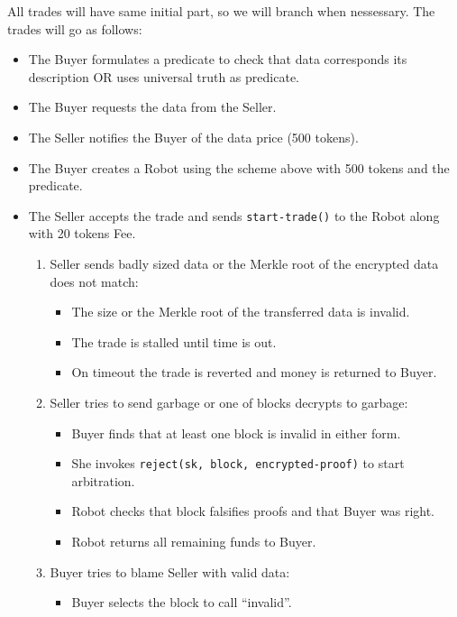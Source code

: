 All trades will have same initial part, so we will branch when nessessary.
The trades will go as follows:
\begin{itemize}
  \item The Buyer formulates a predicate to check that data corresponds its description OR uses universal truth as predicate.
  \item The Buyer requests the data from the Seller.
  \item The Seller notifies the Buyer of the data price (500 tokens).
  \item The Buyer creates a Robot using the scheme above with 500 tokens and the predicate.
  \item The Seller accepts the trade and sends \verb|start-trade()| to the Robot along with 20 tokens Fee.

  \begin{enumerate}
    \item Seller sends badly sized data or the Merkle root of the encrypted data does not match:
      \begin{itemize}
        \item The size or the Merkle root of the transferred data is invalid.
        \item The trade is stalled until time is out.
        \item On timeout the trade is reverted and money is returned to Buyer.
      \end{itemize}
    \item Seller tries to send garbage or one of blocks decrypts to garbage:
      \begin{itemize}
        \item Buyer finds that at least one block is invalid in either form.

        \item She invokes \verb|reject(sk, block, encrypted-proof)| to start arbitration.

        \item Robot checks that block falsifies proofs and that Buyer was right.

        \item Robot returns all remaining funds to Buyer.
      \end{itemize}
    \item Buyer tries to blame Seller with valid data:
      \begin{itemize}
        \item Buyer selects the block to call ``invalid''.


\end{itemize}
\end{enumerate}
\end{itemize}
